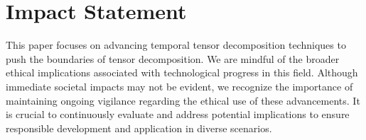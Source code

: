 \section*{Impact Statement}
This paper focuses on advancing temporal tensor decomposition techniques to push the boundaries of tensor decomposition. We are  mindful of the broader ethical implications associated with technological progress in this field. Although immediate societal impacts may not be evident, we recognize the importance of maintaining ongoing vigilance regarding the ethical use of these advancements. It is crucial to continuously evaluate and address potential implications to ensure responsible development and application in diverse scenarios.